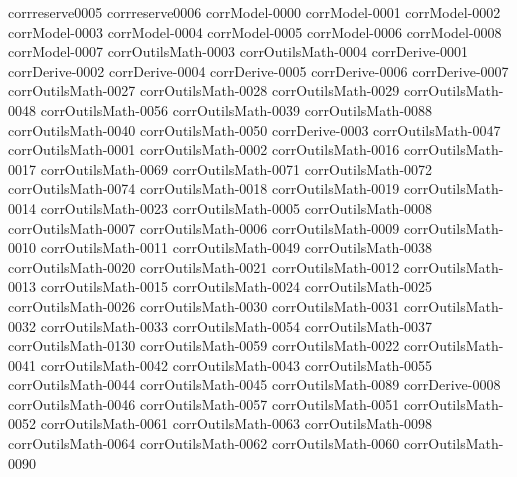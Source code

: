 {corrreserve0005}
{corrreserve0006}
{corrModel-0000}
{corrModel-0001}
{corrModel-0002}
{corrModel-0003}
{corrModel-0004}
{corrModel-0005}
{corrModel-0006}
{corrModel-0008}
{corrModel-0007}
{corrOutilsMath-0003}
{corrOutilsMath-0004}
{corrDerive-0001}
{corrDerive-0002}
{corrDerive-0004}
{corrDerive-0005}
{corrDerive-0006}
{corrDerive-0007}
{corrOutilsMath-0027}
{corrOutilsMath-0028}
{corrOutilsMath-0029}
{corrOutilsMath-0048}
{corrOutilsMath-0056}
{corrOutilsMath-0039}
{corrOutilsMath-0088}
{corrOutilsMath-0040}
{corrOutilsMath-0050}
{corrDerive-0003}
{corrOutilsMath-0047}
{corrOutilsMath-0001}
{corrOutilsMath-0002}
{corrOutilsMath-0016}
{corrOutilsMath-0017}
{corrOutilsMath-0069}
{corrOutilsMath-0071}
{corrOutilsMath-0072}
{corrOutilsMath-0074}
{corrOutilsMath-0018}
{corrOutilsMath-0019}
{corrOutilsMath-0014}
{corrOutilsMath-0023}
{corrOutilsMath-0005}
{corrOutilsMath-0008}
{corrOutilsMath-0007}
{corrOutilsMath-0006}
{corrOutilsMath-0009}
{corrOutilsMath-0010}
{corrOutilsMath-0011}
{corrOutilsMath-0049}
{corrOutilsMath-0038}
{corrOutilsMath-0020}
{corrOutilsMath-0021}
{corrOutilsMath-0012}
{corrOutilsMath-0013}
{corrOutilsMath-0015}
{corrOutilsMath-0024}
{corrOutilsMath-0025}
{corrOutilsMath-0026}
{corrOutilsMath-0030}
{corrOutilsMath-0031}
{corrOutilsMath-0032}
{corrOutilsMath-0033}
{corrOutilsMath-0054}
{corrOutilsMath-0037}
{corrOutilsMath-0130}
{corrOutilsMath-0059}
{corrOutilsMath-0022}
{corrOutilsMath-0041}
{corrOutilsMath-0042}
{corrOutilsMath-0043}
{corrOutilsMath-0055}
{corrOutilsMath-0044}
{corrOutilsMath-0045}
{corrOutilsMath-0089}
{corrDerive-0008}
{corrOutilsMath-0046}
{corrOutilsMath-0057}
{corrOutilsMath-0051}
{corrOutilsMath-0052}
{corrOutilsMath-0061}
{corrOutilsMath-0063}
{corrOutilsMath-0098}
{corrOutilsMath-0064}
{corrOutilsMath-0062}
{corrOutilsMath-0060}
{corrOutilsMath-0090}
